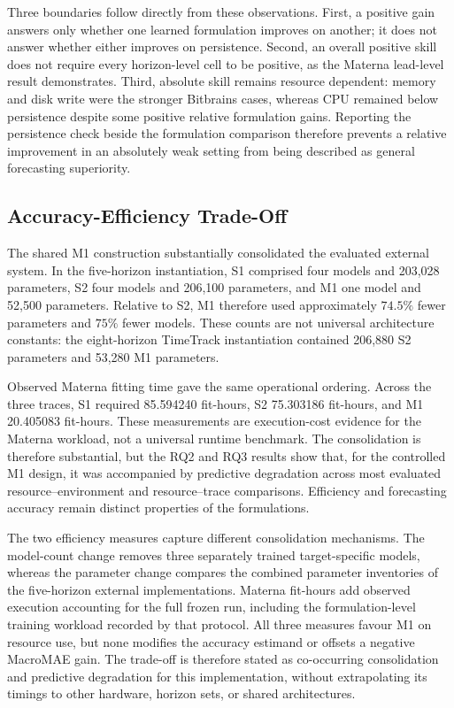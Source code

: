 \documentclass[a4paper,fleqn]{cas-dc}
\begin{document}
Three boundaries follow directly from these observations. First, a positive
gain answers only whether one learned formulation improves on another; it does
not answer whether either improves on persistence. Second, an overall positive
skill does not require every horizon-level cell to be positive, as the Materna
lead-level result demonstrates. Third, absolute skill remains resource
dependent: memory and disk write were the stronger Bitbrains cases, whereas
CPU remained below persistence despite some positive relative formulation
gains. Reporting the persistence check beside the formulation comparison
therefore prevents a relative improvement in an absolutely weak setting from
being described as general forecasting superiority.

\subsection{Accuracy-Efficiency Trade-Off}
\label{sec:results-efficiency}

The shared M1 construction substantially consolidated the evaluated external
system. In the five-horizon instantiation, S1 comprised four models and 203,028
parameters, S2 four models and 206,100 parameters, and M1 one model and 52,500
parameters. Relative to S2, M1 therefore used approximately $74.5\%$ fewer
parameters and $75\%$ fewer models. These counts are not universal architecture
constants: the eight-horizon TimeTrack instantiation contained 206,880 S2
parameters and 53,280 M1 parameters.



Observed Materna fitting time gave the same operational ordering. Across the
three traces, S1 required 85.594240 fit-hours, S2 75.303186 fit-hours, and M1
20.405083 fit-hours. These measurements are execution-cost evidence for the
Materna workload, not a universal runtime benchmark. The consolidation is
therefore substantial, but the RQ2 and RQ3 results show that, for the controlled
M1 design, it was accompanied by predictive degradation across most evaluated
resource--environment and resource--trace comparisons. Efficiency and
forecasting accuracy remain distinct properties of the formulations.

The two efficiency measures capture different consolidation mechanisms. The
model-count change removes three separately trained target-specific models,
whereas the parameter change compares the combined parameter inventories of
the five-horizon external implementations. Materna fit-hours add observed
execution accounting for the full frozen run, including the formulation-level
training workload recorded by that protocol. All three measures favour M1 on
resource use, but none modifies the accuracy estimand or offsets a negative
MacroMAE gain. The trade-off is therefore stated as co-occurring consolidation
and predictive degradation for this implementation, without extrapolating its
timings to other hardware, horizon sets, or shared architectures.
\end{document}
